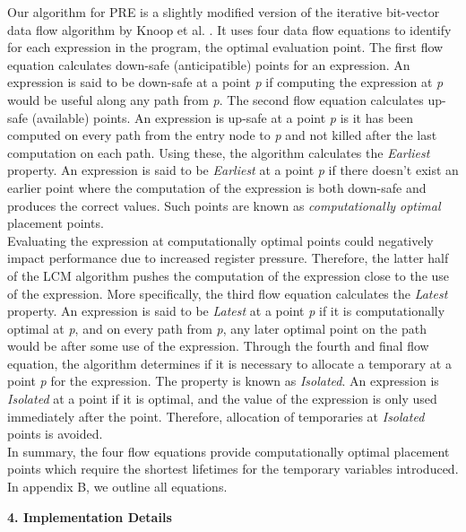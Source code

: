 \documentclass[10pt,twoside]{report}
\begin{document}
Our algorithm for PRE is a slightly modified version of the iterative bit-vector data flow
algorithm by Knoop et al. \cite{Knoop}. It uses four data flow equations to identify for each expression
in the program, the optimal evaluation point. The first flow equation calculates down-safe (anticipatible) points 
for an expression. An expression is said to be down-safe at a point \emph{p} if computing the 
expression at \emph{p} would be useful along any path from \emph{p}. The second flow equation 
calculates up-safe (available) points. An expression is up-safe at a point \emph{p} is it has been computed
on every path from the entry node to \emph{p} and not killed after the last computation on each 
path. Using these, the algorithm calculates the \emph{Earliest} property. An expression is said to
be \emph{Earliest} at a point \emph{p} if there doesn't exist an earlier point where the computation
of the expression is both down-safe and produces the correct values. Such points are known
as \emph{computationally optimal} placement points. \\

Evaluating the expression at computationally optimal points could negatively impact
performance due to increased register pressure. Therefore, the latter half of the LCM algorithm pushes 
the computation of the expression close to the use of the expression.
More specifically, the third flow equation calculates the \emph{Latest} property. An expression is 
said to be \emph{Latest} at a point \emph{p} if it is computationally optimal at \emph{p}, and on every
path from \emph{p}, any later optimal point on the path would be after some use of the expression.
Through the fourth and final flow equation, the algorithm determines if it is necessary to allocate a 
temporary at a point \emph{p} for the expression. The property is known as \emph{Isolated}. An expression
is \emph{Isolated} at a point if it is optimal, and the value of the expression is only used immediately 
after the point. Therefore, allocation of temporaries at \emph{Isolated} points is avoided.\\

In summary, the four flow equations provide computationally optimal 
placement points which require the shortest lifetimes for the temporary variables introduced. In appendix B, we 
outline all equations.

\begin{flushleft}
\textbf{\Large{4. Implementation Details}}
\end{flushleft}
\end{document}
